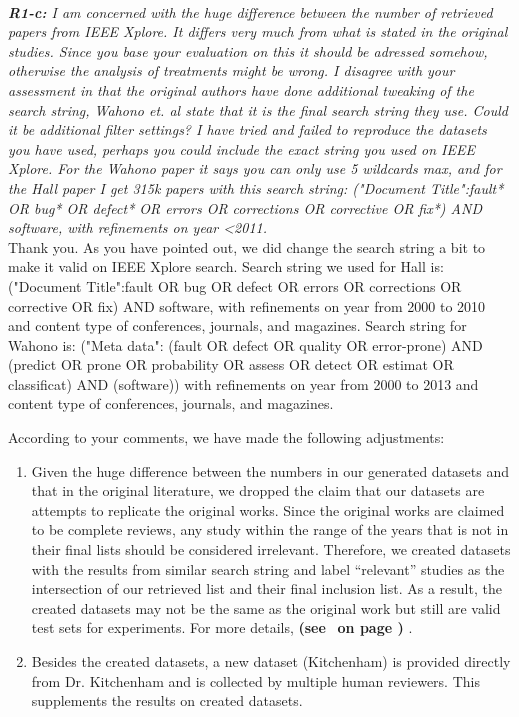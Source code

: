\documentclass{svjour3}
\theoremstyle{break}
\newcommand{\review}[1]{{\textit{#1}}~\\}
\newcommand{\citeresp}[1]{
{\bf (see } \fcolorbox{black}{black!15}{
 \bf
  \scriptsize R-{#1}}~{\bf{on page \pageref{response:#1})}}
}
\begin{document}
 \par ~

 
\review{\textbf{R1-c:} I am concerned with the huge difference between the number of retrieved papers from IEEE Xplore. It differs very much from what is stated in the original studies. Since you base your evaluation on this it should be adressed somehow, otherwise the analysis of treatments might be wrong. I disagree with your assessment in that the original authors have done additional tweaking of the search string, Wahono et. al state that it is the final search string they use. Could it be additional filter settings? I have tried and failed to reproduce the datasets you have used, perhaps you could include the exact string you used on IEEE Xplore. For the Wahono paper it says you can only use 5 wildcards max, and for the Hall paper I get 315k papers with this search string: ("Document Title":fault* OR bug* OR defect* OR errors OR corrections OR corrective OR fix*) AND software, with refinements on year <2011.
}

Thank you. As you have pointed out, we did change the search string a bit to make it valid on IEEE Xplore search. Search string we used for Hall is: ("Document Title":fault OR bug OR defect OR errors OR corrections OR corrective OR fix) AND software, with refinements on year from 2000 to 2010 and content type of conferences, journals, and magazines. Search string for Wahono is: ("Meta data": (fault OR defect OR quality OR error-prone) AND (predict OR prone OR probability OR assess OR detect OR estimat OR classificat) AND (software)) with refinements on year from 2000 to 2013 and content type of conferences, journals, and magazines.

According to your comments, we have made the following adjustments:

\begin{enumerate}
\item
Given the huge difference between the numbers in our generated datasets and that in the original literature, we dropped the claim that our datasets are attempts to replicate the original works. Since the original works are claimed to be complete reviews, any study within the range of the years that is not in their final lists should be considered irrelevant. Therefore, we created datasets with the results from similar search string and label ``relevant'' studies as the intersection of our retrieved list and their final inclusion list. As a result, the created datasets may not be the same as the original work but still are valid test sets for experiments. For more details, \citeresp{1c}.

\item
Besides the created datasets, a new dataset (Kitchenham) is provided directly from Dr. Kitchenham and is collected by multiple human reviewers. This supplements the results on created datasets. 

\end{enumerate}
 
\end{document}
